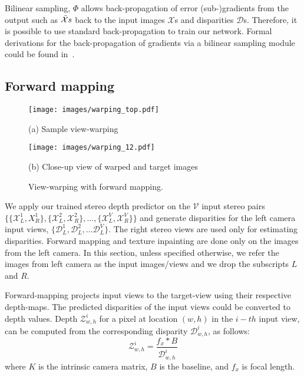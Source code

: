 \documentclass[runningheads]{llncs}
\begin{document}

Bilinear sampling, $\Phi$ allows back-propagation of error (sub-)gradients from the output such as $\Tilde{\mathcal{X}}s$ back to the input images $\mathcal{X}$s and disparities $\mathcal{D}$s. Therefore, it is possible to use standard back-propagation to train our network. Formal derivations for the back-propagation of gradients via a bilinear sampling module could be found in~\cite{jaderberg2015spatial}. 

\subsection{Forward mapping}\label{sec:fwdmap}

\begin{figure}[htb!]
\begin{minipage}[b]{1.0\linewidth}
  \centering
 \centerline{\texttt{[image: images/warping\_top.pdf]}}
  \centerline{(a) Sample view-warping}%
  \end{minipage}
\begin{minipage}[b]{1.0\linewidth}
  \centering
  \centerline{\texttt{[image: images/warping\_12.pdf]}}
  \centerline{(b) Close-up view of warped and target images}%
  \end{minipage}
\caption{View-warping with forward mapping.}
\label{fig:warpedview}
\end{figure}

We apply our trained stereo depth predictor on the $\mathcal{V}$ input stereo pairs $\{\{\mathcal{X}^{1}_{L}, X^{1}_{R}\},\{\mathcal{X}^{2}_{L}, \mathcal{X}^{2}_{R}\}, \dots,  \{\mathcal{X}^{V}_{L}, \mathcal{X}^{V}_{R}\}\}$ and generate disparities for the left camera input views, $\{\mathcal{D}^{1}_{L}, \mathcal{D}^{2}_{L}, \dots \mathcal{D}^{V}_{L}\}$. The right stereo views are used only for estimating disparities. Forward mapping and texture inpainting are done only on the images from the left camera. In this section, unless specified otherwise, we refer the images from left camera as the input images/views and we drop the subscripts $L$ and $R$.

Forward-mapping projects input views to the target-view using their respective depth-maps. The predicted disparities of the input views could be converted to depth values. Depth $\mathcal{Z}^{i}_{w,h}$ for a pixel at location $(w,h)$ in the $i-th$ input view, can be computed from the corresponding disparity $\mathcal{D}^{i}_{w,h}$, as follows:
\begin{equation}
    \mathcal{Z}^{i}_{w,h} = \frac{f_{x}*B}{\mathcal{D}^{i}_{w,h}}
\end{equation}
where $K$ is the intrinsic camera matrix, $B$ is the baseline, and $f_{x}$ is focal length.
\end{document}
